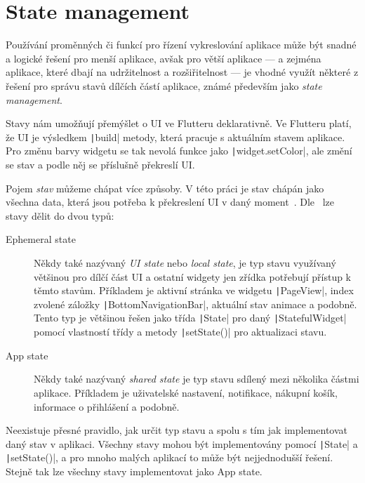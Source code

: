 \section{State management}

Používání proměnných či funkcí pro řízení vykreslování aplikace může být
snadné a logické řešení pro menší aplikace,
avšak pro větší aplikace
--- a zejména aplikace, které dbají na udržitelnost a rozšiřitelnost ---
je vhodné využít některé z řešení pro správu stavů dílčích částí aplikace,
známé především jako \emph{state management}.

Stavy nám umožňují přemýšlet o UI ve Flutteru deklarativně.
Ve Flutteru platí,
že UI je výsledkem \texttt|build| metody,
která pracuje s aktuálním stavem aplikace.
Pro změnu barvy widgetu se tak nevolá funkce jako
\texttt|widget.setColor|,
ale změní se stav a podle něj se příslušně
překreslí UI.~\cite{flutter_state_mgmt_declarative}

Pojem \emph{stav} můžeme chápat více způsoby.
V této práci je stav chápán jako všechna data,
která jsou potřeba k překreslení UI
v daný moment~\cite{flutter_state_mgmt_ephemeral_vs_app}.
Dle~\cite{flutter_state_mgmt_ephemeral_vs_app} lze stavy dělit do dvou typů:

\begin{description}
    \item[Ephemeral state] Někdy také nazývaný \emph{UI state} nebo
    \emph{local state},
    je typ stavu využívaný většinou pro dílčí část UI
    a ostatní widgety jen zřídka potřebují přístup k těmto stavům.
    Příkladem je aktivní stránka ve widgetu \texttt|PageView|,
    index zvolené záložky \texttt|BottomNavigationBar|,
    aktuální stav animace a podobně.
    Tento typ je většinou řešen jako třída \texttt|State| pro daný
    \texttt|StatefulWidget| pomocí vlastností třídy a metody
    \texttt|setState()| pro aktualizaci stavu.
    \item[App state] Někdy také nazývaný \emph{shared state} je typ stavu
    sdílený mezi několika částmi aplikace.
    Příkladem je uživatelské nastavení, notifikace, nákupní košík,
    informace o přihlášení a podobně.
\end{description}

Neexistuje přesné pravidlo,
jak určit typ stavu a spolu s tím jak implementovat daný stav v aplikaci.
Všechny stavy mohou být implementovány pomocí \texttt|State| a
\texttt|setState()|,
a pro mnoho malých aplikací to může být nejjednodušší řešení.
Stejně tak lze všechny stavy implementovat jako
App state.~\cite{flutter_state_mgmt_ephemeral_vs_app}

